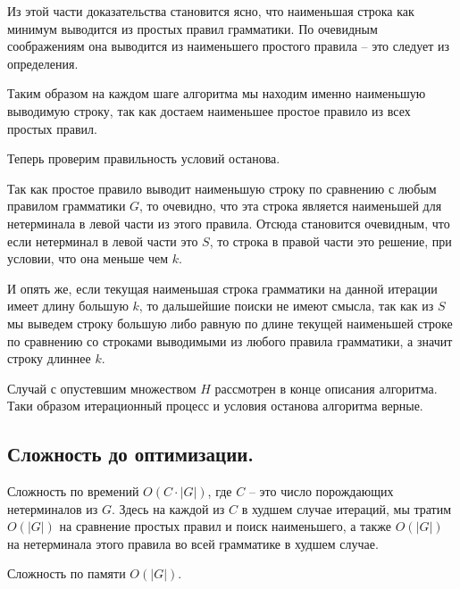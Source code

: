 \documentclass[12pt]{article}
\begin{document}
Из этой части доказательства становится ясно, что наименьшая строка
как минимум выводится из простых правил грамматики. По очевидным
соображениям она выводится из наименьшего простого правила -- это следует
из определения.

Таким образом на каждом шаге алгоритма мы находим именно наименьшую
выводимую строку, так как достаем наименьшее простое правило из всех
простых правил.

Теперь проверим правильность условий останова.

Так как простое правило выводит наименьшую строку по сравнению с любым
правилом грамматики $ G $, то очевидно, что эта строка является наименьшей
для нетерминала в левой части из этого правила. Отсюда становится очевидным,
что если нетерминал в левой части это $ S $, то строка в правой части это
решение, при условии, что она меньше чем $ k $.

И опять же, если текущая наименьшая строка грамматики на данной итерации
имеет длину большую $ k $, то дальшейшие поиски не имеют смысла, так как из
$ S $ мы выведем строку большую либо равную по длине текущей наименьшей
строке по сравнению со строками выводимыми из любого правила грамматики,
а значит строку длиннее $ k $.

Случай с опустевшим множеством $ H $ рассмотрен в конце описания алгоритма.
Таки образом итерационный процесс и условия останова алгоритма верные.

\subsection{Сложность до оптимизации.}
Сложность по времений $ O(C \cdot |G|) $,
где $ C $ -- это число порождающих нетерминалов из $ G $.
Здесь на каждой из $ C $ в худшем случае итераций, мы тратим $ O(|G|) $
на сравнение простых правил и поиск наименьшего, а также $ O(|G|) $ на
нетерминала этого правила во всей грамматике в худшем случае.

Сложность по памяти $ O(|G|) $.
\end{document}
